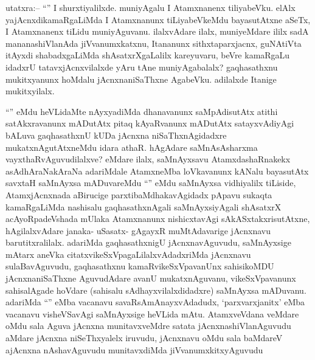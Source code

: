 
\begin{artha}
utatxra:-- ``\stext'' I shurxtiyalilxde. muniyAgalu I Atamxnanenx tiliyabeVku. elAlx yajAcnxdikamaRgaLiMda I Atamxnanunx tiLiyabeVkeMdu bayasutAtxne aSeTx, I Atamxnanenx tiLidu muniyAguvanu. ilalxvAdare ilalx, muniyeMdare ililx sadA mananashiVlanAda jiVvanumxkatxnu, Itananunx sithxtaparxjacnx, guNAtiVta itAyxdi shabadxgaLiMda shAsatxrXgaLalilx kareyuvaru, beVre kamaRgaLu idadxrU tatavxjAcnxvilalxde yAru tAne muniyAgabalalx? gaqhasathxnu mukitxyanunx hoMdalu jAcnxnaniSaThxne AgabeVku. adilalxde Itanige mukitxyilalx.
\end{artha}


\begin{artha}
``\stext'' eMdu heVLidaMte nAyxyadiMda dhanavanunx saMpAdisutAtx atithi satAkxravanunx mADutAtx pitaq kAyaRvanunx mADutAtx satayxvAdiyAgi bALuva gaqhasathxnU kUDa jAcnxna niSaThxnAgidadxre mukatxnAgutAtxneMdu idara athaR. hAgAdare saMnAsAsharxma vayxthaRvAguvudilalxve? eMdare ilalx, saMnAyxsavu AtamxdashaRnakekx asAdhAraNakAraNa adariMdale AtamxneMba loVkavanunx kANalu bayasutAtx savxtaH saMnAyxsa mADuvareMdu ``\stext'' eMdu saMnAyxsa vidhiyalilx tiLiside, AtamxjAcnxnada aBirucige parxtibaMdhakavAgidadx pApavu sukaqta kamaRgaLiMda nashisalu gaqhasathxnAgali saMnAyxsiyAgali shAsatxrX acAyoRpadeVshada mUlaka Atamxnanunx nishicxtavAgi sAkASxtakxrisutAtxne, hAgilalxvAdare janaka- uSasatx- gAgayxR muMtAdavarige jAcnxnavu barutitxralilalx. adariMda gaqhasathxnigU jAcnxnavAguvudu, saMnAyxsige mAtarx aneVka citatxvikeSxVpagaLilalxvAdadxriMda jAcnxnavu sulaBavAguvudu, gaqhasathxnu kamaRvikeSxVpavanUnx sahisikoMDU jAcnxnaniSaThxne AguvudAdare avanU mukatxnAguvanu, vikeSxVpavanunx sahisalAgade hoVdare (sahisalu sAdhayxvilalxdidadxre) saMnAyxsa mADuvanu. adariMda ``\stext'' eMba vacanavu savaRsAmAnayxvAdadudx, `parxvarxjanitx' eMba vacanavu visheVSavAgi saMnAyxsige heVLida mAtu. AtamxveVdana veMdare oMdu sala Aguva jAcnxna munitavxveMdre satata jAcnxnashiVlanAguvudu aMdare jAcnxna niSeThxyalelx iruvudu, jAcnxnavu oMdu sala baMdareV ajAcnxna nAshavAguvudu munitavxdiMda jiVvanumxkitxyAguvudu
\end{artha}


